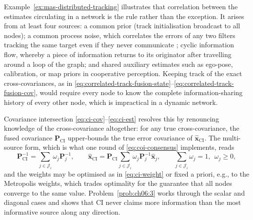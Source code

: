 \documentclass[graybox,envcountchap]{style/SNmono}
\begin{document}
Example~\ref{ex:mas-distributed-tracking} illustrates that correlation between the estimates circulating in a network is the rule rather than the exception. It arises from at least four sources: a common prior (track initialisation broadcast to all nodes); a common process noise, which correlates the errors of any two filters tracking the same target even if they never communicate \cite{barshalom2011tracking}; cyclic information flow, whereby a piece of information returns to its originator after travelling around a loop of the graph; and shared auxiliary estimates such as ego-pose, calibration, or map priors in cooperative perception. Keeping track of the exact cross-covariances, as in \eqref{eq:correlated-track-fusion-state}--\eqref{eq:correlated-track-fusion-cov}, would require every node to know the complete information-sharing history of every other node, which is impractical in a dynamic network.

Covariance intersection \eqref{eq:ci-cov}--\eqref{eq:ci-est} \cite{julier1997nondivergent} resolves this by renouncing knowledge of the cross-covariance altogether: for any true cross-covariance, the fused covariance $\mathbf{P}_{\mathrm{CI}}$ upper-bounds the true error covariance of $\widehat{\mathbf{x}}_{\mathrm{CI}}$. The multi-source form, which is what one round of \eqref{eq:coi-consensus} implements, reads
\begin{equation}
\mathbf{P}_{\mathrm{CI}}^{-1}=\sum_{j\in\mathcal{J}_i}\omega_j\mathbf{P}_j^{-1},\qquad
\widehat{\mathbf{x}}_{\mathrm{CI}}=\mathbf{P}_{\mathrm{CI}}\sum_{j\in\mathcal{J}_i}\omega_j\mathbf{P}_j^{-1}\widehat{\mathbf{x}}_j,\qquad
\sum_{j\in\mathcal{J}_i}\omega_j=1,\ \ \omega_j\ge0,
\label{eq:ci-multi}
\end{equation}
and the weights may be optimised as in \eqref{eq:ci-weight} or fixed a priori, e.g., to the Metropolis weights, which trades optimality for the guarantee that all nodes converge to the same value. Problem~\ref{prob:ch06:3} works through the scalar and diagonal cases and shows that CI never claims more information than the most informative source along any direction.
\end{document}
